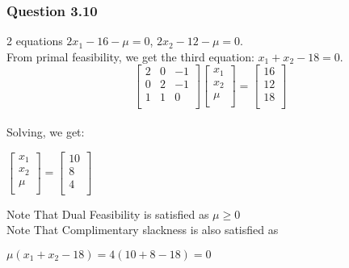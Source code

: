 \documentclass{beamer}
\begin{document}
\begin{frame}
\frametitle{Question 3.10}

 2 equations $2x_1 - 16 - \mu =0$, $2x_2 - 12 - \mu=0$.\\
From primal feasibility, we get the third equation: $x_1+x_2-18=0$.
\begin{equation*}
    \begin{bmatrix}
    2       & 0 & -1  \\
   0       & 2 & -1  \\

   1      & 1 & 0 \\
\end{bmatrix}
  \begin{bmatrix}
    x_1  \\
   x_2  \\

   \mu \\
\end{bmatrix}
=\begin{bmatrix}
    16  \\
   12  \\
   18 \\
\end{bmatrix}

\end{equation*}\\
Solving, we get:
\begin{center}
    

$

  \begin{bmatrix}
    x_1  \\
   x_2  \\

   \mu \\
\end{bmatrix}
=\begin{bmatrix}
    10  \\
   8  \\
   4 \\
\end{bmatrix}

$
\end{center}

Note That Dual Feasibility is satisfied as $\mu \geq 0$\\
Note That Complimentary slackness is also satisfied as\\
\begin{center}
$\mu(x_1+x_2-18)=4(10+8-18)=0$

\end{center}


\end{frame}
\end{document}
